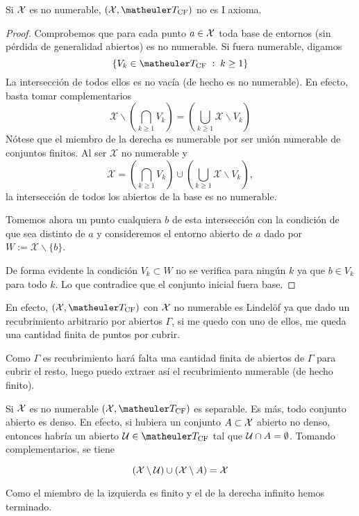 \begin{lem}[I axioma]
	Si $\mathcal{X}$ es no numerable, $(\X,\T_{\mathrm{CF}})$ no es I axioma.
\end{lem}
\begin{proof}
	Comprobemos que para cada punto $a\in \mathcal{X}$ toda base de entornos (sin pérdida de generalidad abiertos) es no numerable. Si fuera numerable, digamos 
	\[\{V_k \in\T_{\text{CF}}\midc k \geq 1\}\]
	La intersección de todos ellos es no vacía (de hecho es no numerable). En efecto, basta tomar complementarios
	\[\mathcal{X} \backslash \left(\bigcap_{k\geq 1} V_k\right)= \left(\bigcup_{k\geq 1} \mathcal{X} \backslash V_k\right)\]
	Nótese que el miembro de la derecha es numerable por ser unión numerable de conjuntos finitos. Al ser $\mathcal{X}$ no numerable y 
	\[\mathcal{X}= \left(\bigcap_{k\geq 1} V_k\right) \cup \left(\bigcup_{k\geq 1} \mathcal{X}\backslash V_k\right),\]
	la intersección de todos los abiertos de la base es no numerable.
	
	Tomemos ahora un punto cualquiera $b$ de esta intersección con la condición de que sea distinto de $a$ y consideremos el entorno abierto de $a$ dado por $W:=\mathcal{X}\backslash \{b\}$.
	
	De forma evidente la condición $V_k \subset W$ no se verifica para ningún $k$ ya que $b\in V_k$ para todo $k$. Lo que contradice que el conjunto inicial fuera base.
\end{proof}
\begin{obs}
	En efecto, $(\X,\T_{\text{CF}})$ con $\mathcal{X}$ no numerable es Lindelöf ya que dado un recubrimiento arbitrario por abiertos $\Gamma$, si me quedo con uno de ellos, me queda una cantidad finita de puntos por cubrir.
	
	Como $\Gamma$ es recubrimiento hará falta una cantidad finita de abiertos de $\Gamma$ para cubrir el resto, luego puedo extraer así el recubrimiento numerable (de hecho finito).
\end{obs}

\begin{obs}
	Si $\mathcal{X}$ es no numerable $(\X,\T_{\text{CF}})$ es separable. Es más, todo conjunto abierto es denso. En efecto, si hubiera un conjunto $A\subset \mathcal{X}$ abierto no denso, entonces habría un abierto $\U\in \T_{\text{CF}}$ tal que $\mathcal{U}\cap A = \emptyset$. Tomando complementarios, se tiene
	
	\[(\mathcal{X}\setminus \mathcal{U})\cup (\mathcal{X}\setminus A)=\mathcal{X}\]
	
	Como el miembro de la izquierda es finito y el de la derecha infinito hemos terminado.
\end{obs}

